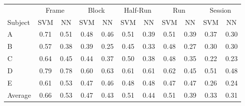 
\begin{tabular}{l *{10}{c}}
\toprule
& \multicolumn{2}{c}{Frame} & \multicolumn{2}{c}{Block} & \multicolumn{2}{c}{Half-Run} & \multicolumn{2}{c}{Run} & \multicolumn{2}{c}{Session} \\
\cmidrule(lr){2-3} \cmidrule(rl){4-5} \cmidrule(rl){6-7} \cmidrule(rl){8-9} \cmidrule(l){10-11}
Subject & SVM & NN & SVM & NN & SVM & NN & SVM & NN & SVM & NN\\
\midrule
A & 0.71 & 0.51 & 0.48 & 0.46 & 0.51 & 0.39 & 0.51 & 0.39 & 0.37 & 0.30 \\
B & 0.57 & 0.38 & 0.39 & 0.25 & 0.45 & 0.33 & 0.48 & 0.27 & 0.30 & 0.30 \\
C & 0.64 & 0.45 & 0.44 & 0.37 & 0.50 & 0.38 & 0.48 & 0.35 & 0.22 & 0.23 \\
D & 0.79 & 0.78 & 0.60 & 0.63 & 0.61 & 0.61 & 0.62 & 0.45 & 0.51 & 0.48 \\
E & 0.61 & 0.53 & 0.47 & 0.46 & 0.48 & 0.48 & 0.47 & 0.47 & 0.26 & 0.24 \\
Average & 0.66 & 0.53 & 0.47 & 0.43 & 0.51 & 0.44 & 0.51 & 0.39 & 0.33 & 0.31 \\
\bottomrule
\end{tabular}
